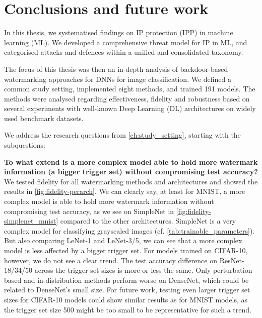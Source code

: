 \chapter{Conclusions and future work}
\label{ch:conclusions}


In this thesis, we systematised findings on IP protection (IPP) in machine learning (ML). We developed a comprehensive threat model for IP in ML, and categorised attacks and defences within a unified and consolidated taxonomy.

The focus of this thesis was then an in-depth analysis of backdoor-based watermarking approaches for DNNs for image classification. We defined a common study setting, implemented eight methods, and trained 191 models. The methods were analysed regarding effectiveness, fidelity and robustness based on several experiments with well-known Deep Learning (DL) architectures on widely used benchmark datasets.

We address the research questions from \cref{ch:study_setting}, starting with the subquestions:

\textbf{To what extend is a more complex model able to hold more watermark information (a bigger trigger set) without compromising test accuracy?}
We tested fidelity for all watermarking methods and architectures and showed the results in \cref{fig:fidelity-perarch}. We can clearly say, at least for MNIST, a more complex model is able to hold more watermark information without compromising test accuracy, as we see on SimpleNet in \cref{fig:fidelity-simplenet_mnist} compared to the other architectures. SimpleNet is a very complex model for classifying grayscaled images (cf. \cref{tab:trainable_parameters}). But also comparing LeNet-1 and LeNet-3/5, we can see that a more complex model is less affected by a bigger trigger set. For models trained on CIFAR-10, however, we do not see a clear trend. The test accuracy difference on ResNet-18/34/50 across the trigger set sizes is more or less the same. Only perturbation based and in-distribution methods perform worse on DenseNet, which could be related to DenseNet's small size. For future work, testing even larger trigger set sizes for CIFAR-10 models could show similar results as for MNIST models, as the trigger set size 500 might be too small to be representative for such a trend.

